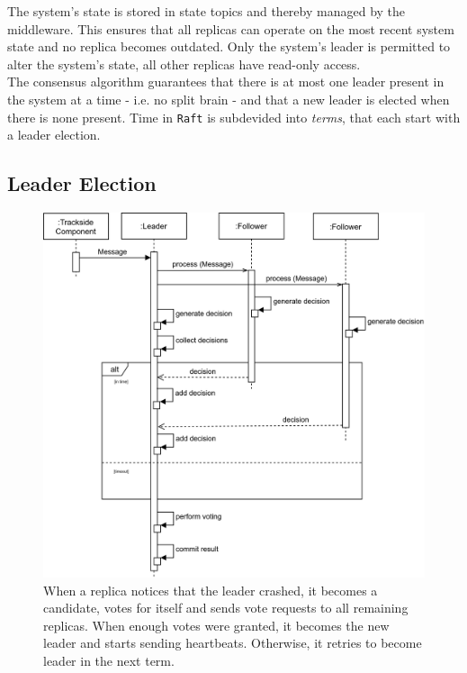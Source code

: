 The system's state is stored in  state topics and thereby managed by the middleware.
This ensures that all replicas can operate on the most recent system state and no replica becomes outdated.
Only the system's leader is permitted to alter the system's state, all other replicas have read-only access.
\\

The consensus algorithm guarantees that there is at most one leader present in the system at a time - i.e. no split brain - and that a new leader is elected when there is none present.
Time in \texttt{Raft} is subdevided into \textit{terms}, that each start with a leader election.

\subsection{Leader Election}
\begin{figure}[!hb]
	\centering
	\includegraphics[width=0.75\linewidth]{images/sequence/CollectResults}
	\caption{When a replica notices that the leader crashed, it becomes a candidate, votes for itself and sends vote requests to all remaining replicas. When enough votes were granted, it becomes the new leader and starts sending heartbeats. Otherwise, it retries to become leader in the next term.}
	\label{fig:SeqLeaderElection}
\end{figure}

